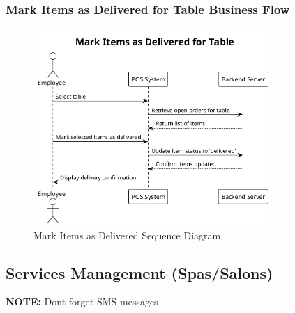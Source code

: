 \documentclass[]{VUMIFTemplateClass}
\newcommand{\noticecomment}[1]{%
    \begin{tcolorbox}[colback=blue!20, colframe=blue!60, arc=0pt, outer arc=0pt, boxrule=1pt, left=3pt, right=3pt, top=3pt, bottom=3pt]
        \textbf{\textcolor{blue!70!black}{NOTE:}} #1
    \end{tcolorbox}
}
\begin{document}
\subsubsection{Mark Items as Delivered for Table Business Flow}


\begin{figure}[H]
    \centering
    \includegraphics[width=0.8\textwidth]{images/diagrams/orders/order_mark_table_items_delivered_sequence.png}
    \caption{Mark Items as Delivered Sequence Diagram}
    \label{fig:mark_items_delivered_sequence}                   
\end{figure}


\subsection{Services Management (Spas/Salons)}

%
\noticecomment{Dont forget SMS messages}
\end{document}
